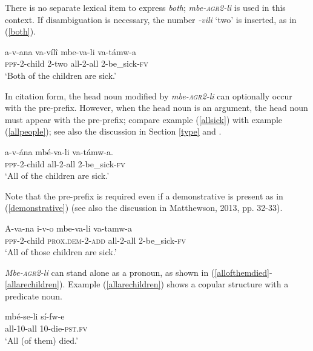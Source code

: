 \documentclass[letterpaper, 12pt]{article}
\begin{document}
There is no separate lexical item to express \textit{both}; \textit{mbe-\textsc{agr2}-li} is used in this context.  If disambiguation is necessary, the number \textit{-vili} `two' is inserted, as in (\ref{both}).

\begin{exe} 

\ex \gll a-v-ana va-v\'il\^i mbe-va-li va-t\'amw-a \\ 
\textsc{ppf}-2-child 2-two all-2-all 2-be\_sick-\textsc{fv} \\ \label{both}
`Both of the children are sick.' \\

\end{exe}


In citation form, the head noun modified by \textit{mbe-\textsc{agr2}-li} can optionally occur with the pre-prefix.  However, when the head noun is an argument, the head noun must appear with the pre-prefix; compare example (\ref{allsick}) with example (\ref{allpeople}); see also the discussion in Section \ref{type} and . 
 
\begin{exe}
\ex \gll a-v-\'ana mb\'e-va-li va-t\'amw-a. \\
\textsc{ppf}-2-child all-2-all 2-be\_sick-\textsc{fv} \\
`All of the children are sick.' \\ \label{allsick}
\end{exe}

Note that the pre-prefix is required even if a demonstrative is present as in (\ref{demonstrative}) (see also the discussion in Matthewson, 2013, pp. 32-33). 
\begin{exe}

\ex \label{demonstrative}\gll A-va-na i-v-o mbe-va-li va-tamw-a \\
\textsc{ppf}-2-child \textsc{prox.dem}-2-\textsc{add} all-2-all 2-be\_sick-\textsc{fv} \\
`All of those children are sick.' \\
\end{exe}


\textit{Mbe-\textsc{agr2}-li} can stand alone as a pronoun, as shown in (\ref{allofthemdied}-\ref{allarechildren}).  Example (\ref{allarechildren}) shows a copular structure with a predicate noun. 

\begin{exe}
\ex \label{allofthemdied} \gll mb\'e-se-li s\'i-fw-e \\ 
all-10-all 10-die-\textsc{pst}.\textsc{fv} \\
`All (of them) died.' 

\end{exe}
\end{document}
